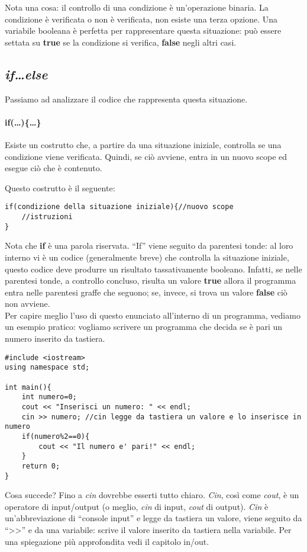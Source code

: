 Nota una cosa: il controllo di una condizione è un'operazione binaria. La condizione è verificata o non è verificata, non esiste una terza opzione. Una variabile booleana è perfetta per rappresentare questa situazione: può essere settata su \textbf{true} se la condizione si verifica, \textbf{false} negli altri casi.\\
\subsection{\emph{if\ldots else}} 
Passiamo ad analizzare il codice che rappresenta questa situazione.
\paragraph{if(\ldots)\{\ldots\}}Esiste un costrutto che, a partire da una situazione iniziale, controlla se una condizione viene verificata.  Quindi, se ciò avviene, entra in un nuovo scope ed esegue ciò che è contenuto.
	
Questo costrutto è il seguente:
\begin{lstlisting}
if(condizione della situazione iniziale){//nuovo scope
	//istruzioni
}
\end{lstlisting}
Nota che \textbf{if} è una parola riservata. ``If'' viene seguito da parentesi tonde: al loro interno vi è un codice (generalmente breve) che controlla la situazione iniziale, questo codice deve produrre un risultato tassativamente booleano. Infatti, se nelle parentesi tonde, a controllo concluso, risulta un valore \textbf{true} allora il programma entra nelle parentesi graffe che seguono; se, invece, si trova un valore \textbf{false} ciò non avviene. \\
	
Per capire meglio l'uso di questo enunciato all'interno di un programma, vediamo un esempio pratico: vogliamo scrivere un programma che decida se è pari un numero inserito da tastiera.
	\begin{lstlisting}
#include <iostream>
using namespace std;

int main(){
	int numero=0;
	cout << "Inserisci un numero: " << endl;
	cin >> numero; //cin legge da tastiera un valore e lo inserisce in numero
	if(numero%2==0){
		cout << "Il numero e' pari!" << endl;
	}
	return 0;
}
\end{lstlisting}

Cosa succede?
Fino a  \emph{cin} dovrebbe esserti tutto chiaro. \emph{Cin}, così come \emph{cout}, è un operatore di input/output (o meglio, \emph{cin} di input, \emph{cout} di output). \emph{Cin} è un'abbreviazione di ``console input'' e legge da tastiera un valore, viene seguito da ``>>'' e da una variabile: scrive il valore inserito da tastiera nella variabile. Per una spiegazione più approfondita vedi il capitolo in/out.

